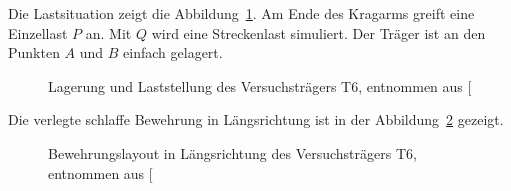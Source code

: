 \documentclass[
  11pt,
  letterpaper,
]{scrreprt}
\begin{document}
Die Lastsituation zeigt die Abbildung~\ref{fig-last_t6}. Am Ende des
Kragarms greift eine Einzellast \(P\) an. Mit \(Q\) wird eine
Streckenlast simuliert. Der Träger ist an den Punkten \(A\) und \(B\)
einfach gelagert.

\begin{figure}[H]


\caption{\label{fig-last_t6}Lagerung und Laststellung des
Versuchsträgers T6, entnommen aus
{[}\citeproc{ref-sigrist_versuche_1993}{5}{]}}

\end{figure}%

Die verlegte schlaffe Bewehrung in Längsrichtung ist in der
Abbildung~\ref{fig-bewehrung_laengs_t6} gezeigt.

\begin{figure}[H]


\caption{\label{fig-bewehrung_laengs_t6}Bewehrungslayout in
Längsrichtung des Versuchsträgers T6, entnommen aus
{[}\citeproc{ref-sigrist_versuche_1993}{5}{]}}

\end{figure}%
\end{document}
